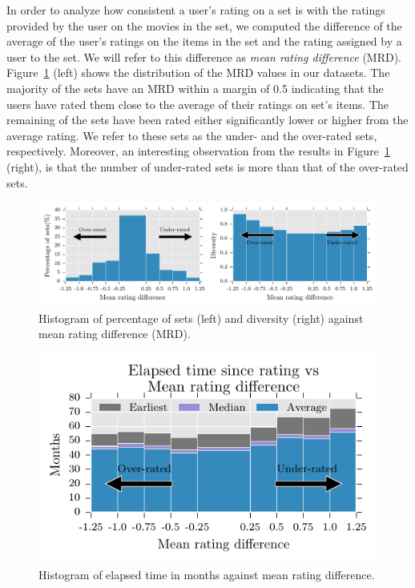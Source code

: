 In order to analyze how consistent a user's rating on a set is with the ratings provided by
the user on the movies in the set, 
we computed the difference of the average of the user's  ratings on the items in the set
and the rating assigned by a user to the set. We
will refer to this difference as \emph{mean rating difference} (MRD). 
Figure~\ref{fig:fractiondiversitymonths} (left) shows the distribution of the MRD values in
our datasets. The majority of the sets have
an MRD within a margin of 0.5 indicating that the users have rated them close to the
average of their ratings on set's items. The remaining of the sets have been
rated either significantly lower or higher from the average rating. We refer 
to these sets as the under- and
the over-rated sets, respectively. Moreover, an interesting observation from the
results in Figure~\ref{fig:fractiondiversitymonths} (right), is that the number of
under-rated sets is more than that of the over-rated sets. 


\begin{figure}[tb]
  \centerline{\includegraphics[scale=0.82]{figures/fractiondiversitymonths_exp_horiz.pdf}}
  \caption{Histogram of percentage of sets (left) and diversity (right) against
  mean rating difference (MRD).}
  \label{fig:fractiondiversitymonths}
\end{figure}


\begin{figure}[bt]
  \centerline{\includegraphics{figures/months_exp.pdf}}
  \caption{Histogram of elapsed time in months against mean rating difference.}
  \label{fig:elapsedmonths}
\end{figure}


